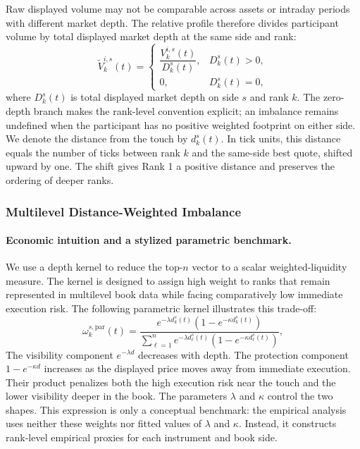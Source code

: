 \documentclass[11pt]{article}
\begin{document}
Raw displayed volume may not be comparable across assets or intraday periods with different market depth. The relative
profile therefore divides participant volume by total displayed market depth at the same side and rank:
\begin{equation}
    \widetilde V^{i,s}_{k}(t)
    =\begin{cases}
    \dfrac{V^{i,s}_{k}(t)}{D^{s}_{k}(t)},
    & D^{s}_{k}(t)>0,\\
    0,
    & D^{s}_{k}(t)=0,
    \end{cases}
    \label{eq:relative_agent_depth}
\end{equation}
where $D^{s}_{k}(t)$ is total displayed market depth on side $s$ and rank $k$. The zero-depth branch makes the rank-level
convention explicit; an imbalance remains undefined when the participant has no positive weighted footprint on either side.
We denote the distance from the touch by $d^{s}_{k}(t)$. In tick units, this distance equals the number of ticks between
rank $k$ and the same-side best quote, shifted upward by one. The shift gives Rank 1 a positive distance and preserves the
ordering of deeper ranks.

\subsubsection{Multilevel Distance-Weighted Imbalance}
\label{subsec:multilevel_dwi}

\paragraph{Economic intuition and a stylized parametric benchmark.}
We use a depth kernel to reduce the top-$n$ vector to a scalar weighted-liquidity measure. The kernel is designed to assign
high weight to ranks that remain represented in multilevel book data while facing comparatively low immediate execution
risk. The following parametric kernel illustrates this trade-off:
\begin{equation}
    \omega^{s,\mathrm{par}}_{k}(t)
    =
    \frac{
        e^{-\lambda d^{s}_{k}(t)}
        \left(1-e^{-\kappa d^{s}_{k}(t)}\right)
    }{
        \sum_{\ell=1}^{n}
        e^{-\lambda d^{s}_{\ell}(t)}\left(
        1-e^{-\kappa d^{s}_{\ell}(t)}\right)
    },
    \label{eq:depth_kernel}
\end{equation}
The visibility component $e^{-\lambda d}$ decreases with depth. The protection component
$1-e^{-\kappa d}$ increases as the displayed price moves away from immediate execution. Their product penalizes both the
high execution risk near the touch and the lower visibility deeper in the book. The parameters $\lambda$ and $\kappa$
control the two shapes. This expression is only a conceptual benchmark: the empirical analysis uses neither these weights
nor fitted values of $\lambda$ and $\kappa$. Instead, it constructs rank-level empirical proxies for each instrument and
book side.
\end{document}
